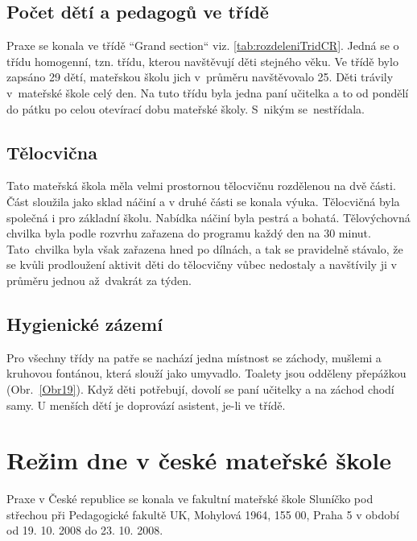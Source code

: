 		\subsection{Počet dětí a pedagogů ve třídě}
		\label{trida}

			Praxe se konala ve třídě “Grand section“ viz. \ref{tab:rozdeleniTridCR}. Jedná se o třídu homogenní, tzn. třídu, kterou navštěvují děti stejného věku. Ve třídě bylo zapsáno 29 dětí, mateřskou školu jich v průměru navštěvovalo 25. Děti trávily v mateřské škole celý den. Na tuto třídu byla jedna paní učitelka a to od pondělí do pátku po celou otevírací dobu mateřské školy. S nikým se nestřídala. 

		\subsection{Tělocvična}
			Tato mateřská škola měla velmi prostornou tělocvičnu rozdělenou na dvě části. Část sloužila jako sklad náčiní a v druhé části se konala výuka. Tělocvičná byla společná i pro základní školu. Nabídka náčiní byla pestrá a bohatá. Tělovýchovná chvilka byla podle rozvrhu zařazena do programu každý den na 30 minut. Tato chvilka byla však zařazena hned po dílnách, a tak se pravidelně stávalo, že se kvůli prodloužení aktivit děti do tělocvičny vůbec nedostaly a navštívily ji v průměru jednou až dvakrát za týden. 

		\subsection{Hygienické zázemí}
		\label{zachody}
			Pro všechny třídy na patře se nachází jedna místnost se záchody, mušlemi a kruhovou fontánou, která slouží jako umyvadlo. Toalety jsou odděleny přepážkou (Obr.~\ref{Obr19}). Když děti potřebují, dovolí se paní učitelky a na záchod chodí samy. U menších dětí je doprovází asistent, je-li ve třídě. 
	



\section{Režim dne v české mateřské škole}

		Praxe v České republice se konala ve fakultní mateřské škole Sluníčko pod střechou při Pedagogické fakultě UK, Mohylová 1964, 155 00, Praha 5 v období od 19. 10. 2008 do 23. 10. 2008. 

